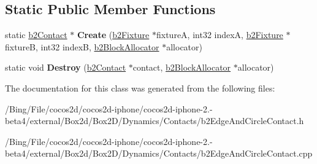 \subsection*{Static Public Member Functions}
\begin{DoxyCompactItemize}
\item 
\hypertarget{classb2_edge_and_circle_contact_a1b4a2a1d4098288c84a7778a4949d0f0}{static \hyperlink{classb2_contact}{b2\-Contact} $\ast$ {\bfseries Create} (\hyperlink{classb2_fixture}{b2\-Fixture} $\ast$fixture\-A, int32 index\-A, \hyperlink{classb2_fixture}{b2\-Fixture} $\ast$fixture\-B, int32 index\-B, \hyperlink{classb2_block_allocator}{b2\-Block\-Allocator} $\ast$allocator)}\label{classb2_edge_and_circle_contact_a1b4a2a1d4098288c84a7778a4949d0f0}

\item 
\hypertarget{classb2_edge_and_circle_contact_a123eeb8144b01fc15c1318eacd0da4ca}{static void {\bfseries Destroy} (\hyperlink{classb2_contact}{b2\-Contact} $\ast$contact, \hyperlink{classb2_block_allocator}{b2\-Block\-Allocator} $\ast$allocator)}\label{classb2_edge_and_circle_contact_a123eeb8144b01fc15c1318eacd0da4ca}

\end{DoxyCompactItemize}


The documentation for this class was generated from the following files\-:\begin{DoxyCompactItemize}
\item 
/\-Bing/\-File/cocos2d/cocos2d-\/iphone/cocos2d-\/iphone-\/2.-\/beta4/external/\-Box2d/\-Box2\-D/\-Dynamics/\-Contacts/b2\-Edge\-And\-Circle\-Contact.\-h\item 
/\-Bing/\-File/cocos2d/cocos2d-\/iphone/cocos2d-\/iphone-\/2.-\/beta4/external/\-Box2d/\-Box2\-D/\-Dynamics/\-Contacts/b2\-Edge\-And\-Circle\-Contact.\-cpp\end{DoxyCompactItemize}
